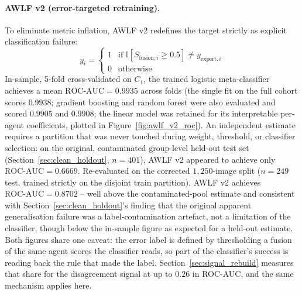 \documentclass[12pt,a4paper]{report}
\begin{document}
\paragraph{AWLF v2 (error-targeted retraining).} To eliminate metric inflation, AWLF v2 redefines the target strictly as explicit classification failure:
\begin{equation}
    y_i = \begin{cases} 1 & \text{if } \mathbb{I}[S_{\text{fusion}, i} \geq 0.5] \neq y_{\text{expert}, i} \\ 0 & \text{otherwise} \end{cases}
\end{equation}
In-sample, 5-fold cross-validated on $C_1$, the trained logistic meta-classifier achieves a mean $\text{ROC-AUC} = 0.9935$ across folds (the single fit on the full cohort scores $0.9938$; gradient boosting and random forest were also evaluated and scored $0.9905$ and $0.9908$; the linear model was retained for its interpretable per-agent coefficients, plotted in Figure~\ref{fig:awlf_v2_roc}). An independent estimate requires a partition that was never touched during weight, threshold, or classifier selection: on the original, contaminated group-level held-out test set (Section~\ref{sec:clean_holdout}, $n=401$), AWLF v2 appeared to achieve only $\text{ROC-AUC} = 0.6669$. Re-evaluated on the corrected $1{,}250$-image split ($n=249$ test, trained strictly on the disjoint train partition), AWLF v2 achieves $\text{ROC-AUC} = \mathbf{0.8702}$ -- well above the contaminated-pool estimate and consistent with Section~\ref{sec:clean_holdout}'s finding that the original apparent generalisation failure was a label-contamination artefact, not a limitation of the classifier, though below the in-sample figure as expected for a held-out estimate. Both figures share one caveat: the error label is defined by thresholding a fusion of the same agent scores the classifier reads, so part of the classifier's success is reading back the rule that made the label. Section~\ref{sec:signal_rebuild} measures that share for the disagreement signal at up to $0.26$ in ROC-AUC, and the same mechanism applies here.
\end{document}
